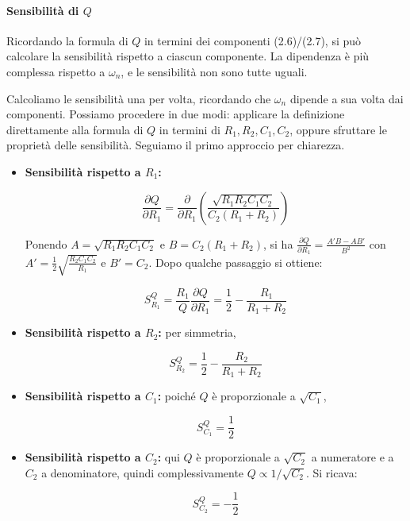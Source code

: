 \paragraph{Sensibilità di \(Q\)}

Ricordando la formula di \(Q\) in termini dei componenti (2.6)/(2.7), si può calcolare la sensibilità rispetto a ciascun componente. La dipendenza è più complessa rispetto a \(\omega_n\), e le sensibilità non sono tutte uguali.

Calcoliamo le sensibilità una per volta, ricordando che \(\omega_n\) dipende a sua volta dai componenti. Possiamo procedere in due modi: applicare la definizione direttamente alla formula di \(Q\) in termini di \(R_1,R_2,C_1,C_2\), oppure sfruttare le proprietà delle sensibilità. Seguiamo il primo approccio per chiarezza.

\begin{itemize}
\item \textbf{Sensibilità rispetto a \(R_1\):}

\begin{equation}
\frac{\partial Q}{\partial R_1} = \frac{\partial}{\partial R_1} \left( \frac{\sqrt{R_1 R_2 C_1 C_2}}{C_2 (R_1+R_2)} \right)
\end{equation}

Ponendo \(A = \sqrt{R_1 R_2 C_1 C_2}\) e \(B = C_2 (R_1+R_2)\), si ha \(\frac{\partial Q}{\partial R_1} = \frac{A' B - A B'}{B^2}\) con \(A' = \frac{1}{2} \sqrt{\frac{R_2 C_1 C_2}{R_1}}\) e \(B' = C_2\). Dopo qualche passaggio si ottiene:

\begin{equation}
S_{R_1}^{Q} = \frac{R_1}{Q} \frac{\partial Q}{\partial R_1} = \frac{1}{2} - \frac{R_1}{R_1+R_2}
\label{eq:S_R1_Q}
\end{equation}

\item \textbf{Sensibilità rispetto a \(R_2\):} per simmetria,

\begin{equation}
S_{R_2}^{Q} = \frac{1}{2} - \frac{R_2}{R_1+R_2}
\label{eq:S_R2_Q}
\end{equation}

\item \textbf{Sensibilità rispetto a \(C_1\):} poiché \(Q\) è proporzionale a \(\sqrt{C_1}\),

\begin{equation}
S_{C_1}^{Q} = \frac{1}{2}
\label{eq:S_C1_Q}
\end{equation}

\item \textbf{Sensibilità rispetto a \(C_2\):} qui \(Q\) è proporzionale a \(\sqrt{C_2}\) a numeratore e a \(C_2\) a denominatore, quindi complessivamente \(Q \propto 1/\sqrt{C_2}\). Si ricava:

\begin{equation}
S_{C_2}^{Q} = -\frac{1}{2}
\label{eq:S_C2_Q}
\end{equation}
\end{itemize}

